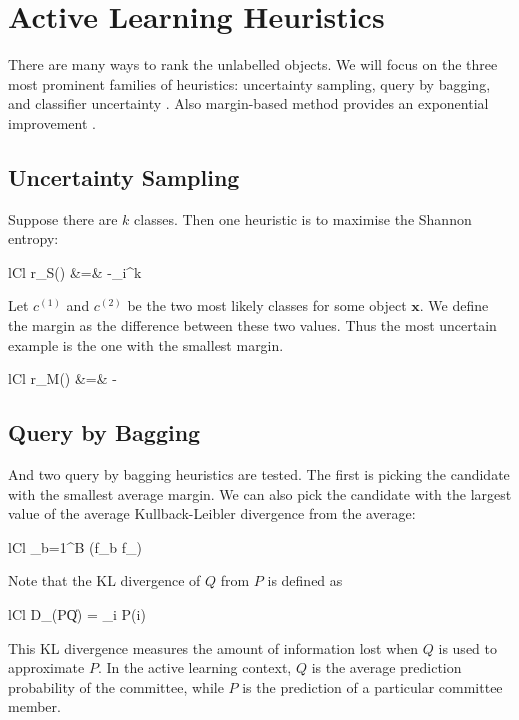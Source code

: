 \section{Active Learning Heuristics}

There are many ways to rank the unlabelled objects. We will focus on the three most
prominent families of heuristics: uncertainty sampling, query by bagging, and classifier
uncertainty \cite{schein07}. Also margin-based method 
provides an exponential improvement \cite{balcan12}.

\subsection{Uncertainty Sampling}

Suppose there are $k$ classes. Then one heuristic is to maximise the Shannon entropy:
	\begin{IEEEeqnarray*}{lCl}
		r_S() &=& -\sum_i^k  \log \big[\Prob{y(\bm{x}) = i} \big]
	\end{IEEEeqnarray*}
Let $c^{(1)}$ and $c^{(2)}$ be the two most likely classes for some object $\bm{x}$.
We define the margin as the difference between these two values. Thus the most uncertain
example is the one with the smallest margin.
	\begin{IEEEeqnarray*}{lCl}
		r_M() &=& -\Big[  \Prob{y(\bm{x}) = c^{(1)}} -  \Prob{y(\bm{x}) = c^{(2)}} \Big]
	\end{IEEEeqnarray*}

\subsection{Query by Bagging}

And two query by bagging heuristics are tested. The first is picking the candidate with the smallest average margin. We can also pick the candidate with the largest value of the average Kullback-Leibler divergence from the average:
	\begin{IEEEeqnarray*}{lCl}
		 \sum_{b=1}^B (f_b \mid\mid f_)
	\end{IEEEeqnarray*}
Note that the KL divergence of $Q$ from $P$ is defined as
	\begin{IEEEeqnarray*}{lCl}
		D_{}(P\|Q) = \sum_i P(i) \, \ln{}
	\end{IEEEeqnarray*}
This KL divergence measures the amount of information lost when $Q$ is used to approximate $P$. In the active learning context, $Q$ is the average prediction probability of the committee, while $P$ is the prediction of a particular committee member.



